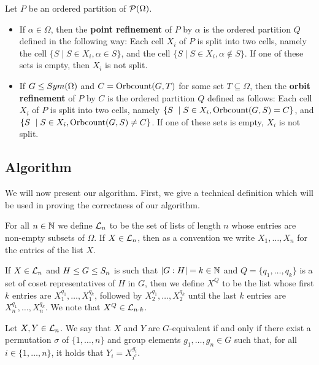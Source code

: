 \begin{defi}\label{def:refiners}
  Let \(P\) be an ordered partition of \(\mathcal{P}(\Omega)\).

  \begin{itemize}
  \item If $\alpha \in \Omega$, then the \textbf{point refinement} of \(P\) by
    $\alpha$ is the ordered partition \(Q\) defined in the following way: Each cell \(X_i\) of \(P\)
    is split into two cells, namely the cell
    {\(\{S \mid S \in X_i, \alpha \in S\}\)}, and the cell
    {\(\{S \mid S \in X_i, \alpha \not\in S\}\)}.
    If one of these sets is empty, then \(X_i\) is not split.

  \item If \(G \le Sym(\Omega)\) and \(C = \operatorname{Orbcount}(G,T)\) for some set
    \(T \subseteq \Omega\), then the \textbf{orbit refinement} of \(P\) by \(C\)
    is the ordered partition \(Q\) defined as follows: Each cell \(X_i\) of \(P\) is split
    into two cells, namely
    \(\{S\ \mid S \in X_i, \operatorname{Orbcount}(G,S) = C\}\), and
    \(\{S\ \mid S \in X_i, \operatorname{Orbcount}(G,S) \neq C\}\).
    If one of these sets is empty, \(X_i\) is not split.
  \end{itemize}
\end{defi}

\subsection{Algorithm}

We will now present our algorithm. First, we give a technical definition which
will be used in proving the correctness of our algorithm.

\begin{defi}
For all $n \in\mathbb{N}$ we define $\mathcal{L}_n$ to be the set of lists of length $n$ whose
entries are non-empty subsets of $\Omega$. If $X \in \mathcal{L}_n$, then as a
convention we write $X_1,\dots,X_n$ for the entries of the list $X$.

If $X \in \mathcal{L}_n$ and $H \le G \le S_{n}$ is such that $|G:H|=k \in \mathbb{N}$ and
$Q=\{q_1,\dots,q_k\}$ is a set of coset representatives of $H$ in $G$, then we
define $X^Q$ to be the list whose first $k$ entries are
$X_1^{q_1},\dots,X_1^{q_k}$, followed by $X_2^{q_1},\dots,X_2^{q_k}$ until the last
$k$ entries are $X_n^{q_1},\dots,X_n^{q_k}$. We note that $X^Q \in \mathcal{L}_{n \cdot
k}$.

Let $X,Y \in \mathcal{L}_n$. We say that $X$ and $Y$ are $G$-equivalent if and only if
there exist a permutation $\sigma$ of $\{1,\dots,n\}$ and group elements
$g_1,\dots,g_n \in G$ such that, for all $i \in \{1,\dots,n\}$, it holds that
$Y_i=X_{i^\sigma}^{g_i}$.
\end{defi}

